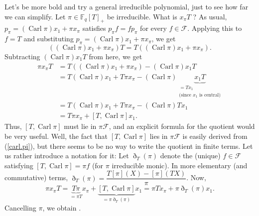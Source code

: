 \documentclass[numbers=enddot,12pt,final,onecolumn,notitlepage]{scrartcl}%
\theoremstyle{definition}
\begin{document}
Let's be more bold and try a general irreducible polynomial, just to see how
far we can simplify. Let $\pi\in\mathbb{F}_{q}\left[  T\right]  _{+}$ be
irreducible. What is $x_{\pi}T$ ? As usual, $p_{\pi}=\left(
\operatorname*{Carl}\pi\right)  x_{1}+\pi x_{\pi}$ satisfies $p_{\pi}%
f=fp_{\pi}$ for every $f\in\mathcal{F}$. Applying this to $f=T$ and
substituting $p_{\pi}=\left(  \operatorname*{Carl}\pi\right)  x_{1}+\pi
x_{\pi}$, we get%
\[
\left(  \left(  \operatorname*{Carl}\pi\right)  x_{1}+\pi x_{\pi}\right)
T=T\left(  \left(  \operatorname*{Carl}\pi\right)  x_{1}+\pi x_{\pi}\right)
.
\]
Subtracting $\left(  \operatorname*{Carl}\pi\right)  x_{1}T$ from here, we get%
\begin{align*}
\pi x_{\pi}T  &  =T\left(  \left(  \operatorname*{Carl}\pi\right)  x_{1}+\pi
x_{\pi}\right)  -\left(  \operatorname*{Carl}\pi\right)  x_{1}T\\
&  =T\left(  \operatorname*{Carl}\pi\right)  x_{1}+T\pi x_{\pi}-\left(
\operatorname*{Carl}\pi\right)  \underbrace{x_{1}T}_{\substack{=Tx_{1}%
\\\text{(since }x_{1}\text{ is central)}}}\\
&  =T\left(  \operatorname*{Carl}\pi\right)  x_{1}+T\pi x_{\pi}-\left(
\operatorname*{Carl}\pi\right)  Tx_{1}\\
&  =T\pi x_{\pi}+\left[  T,\operatorname*{Carl}\pi\right]  x_{1}.
\end{align*}
Thus, $\left[  T,\operatorname*{Carl}\pi\right]  $ must lie in $\pi
\mathcal{F}$, and an explicit formula for the quotient would be very useful.
Well, the fact that $\left[  T,\operatorname*{Carl}\pi\right]  $ lies in
$\pi\mathcal{F}$ is easily derived from (\ref{carl.pi}), but there seems to be
no way to write the quotient in finite terms. Let us rather introduce a
notation for it: Let $\eth_{T}\left(  \pi\right)  $ denote the (unique)
$f\in\mathcal{F}$ satisfying $\left[  T,\operatorname*{Carl}\pi\right]  =\pi
f$ (for $\pi$ irreducible monic). In more elementary (and commutative) terms,
$\eth_{T}\left(  \pi\right)  =\dfrac{T\left[  \pi\right]  \left(  X\right)
-\left[  \pi\right]  \left(  TX\right)  }{\pi}$. Now,%
\[
\pi x_{\pi}T=\underbrace{T\pi}_{=\pi T}x_{\pi}+\underbrace{\left[
T,\operatorname*{Carl}\pi\right]  }_{=\pi\eth_{T}\left(  \pi\right)  }%
x_{1}=\pi Tx_{\pi}+\pi\eth_{T}\left(  \pi\right)  x_{1}.
\]
Cancelling $\pi$, we obtain .
\end{document}
